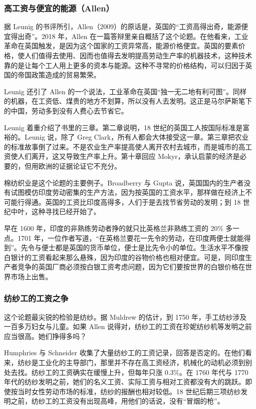 \subsubsection{高工资与便宜的能源（Allen）}
据 Leunig 的书评所引，Allen（2009）的原话是，英国的“工资高得出奇，能源便宜得出奇”\cite{allen2009,leunig2011}。2018 年，Allen 在一篇答辩里亲自概括了这个论题。在他看来，工业革命在英国触发，是因为这个国家的工资异常高，能源价格便宜。英国的要素价格，使人们值得去使用、因而也值得去发明提高劳动生产率的机器技术，这种技术靠的是让每个工人用上更多的资本与能源。这种不寻常的价格结构，可以归因于英国的帝国政策造成的贸易繁荣\cite{allen2018wheels}。

Leunig 还引了 Allen 的一个说法，工业革命在英国“独一无二地有利可图”\cite{leunig2011}。同样的机器，在工资低、煤贵的地方不划算，所以没有人去发明。这正是马尔萨斯笔下的中国，劳动多到没有人费心去节省它。

Leunig 着重介绍了书里的三章。第二章说明，18 世纪的英国工人按国际标准是富裕的。Leunig 说，除了 Greg Clark，所有人都会大体接受这一章。第三章把农业的标准故事倒了过来。不是农业生产率提高使人离开农村去城市，而是城市的高工资使人们离开，这又导致生产率上升\cite{leunig2011}。第十章回应 Mokyr，承认启蒙的经济是必要的，但用欧洲的证据论证它不充分\cite{leunig2011}。

棉纺织业是这个论题的主要例子。Broadberry 与 Gupta 说，英国国内的生产者没有试图模仿印度劳动密集的生产方法，因为按英国的工资水平，那样做在经济上不可能行得通。英国的工资比印度高得多，人们于是去找节省劳动的发明；到 18 世纪中叶，这种寻找已经开始了\cite{bg2005}。

早在 1600 年，印度的非熟练劳动者挣的就只比英格兰非熟练工资的 20\% 多一点。1701 年，一位作者写道，“在英格兰要花一先令的劳动，在印度两便士就能得到”\cite{bg2005}。先令与便士都是英国的货币单位，便士是比先令小的单位。生活水平不像按白银计的工资看起来那么悬殊，因为印度的谷物价格也相对便宜。可是，同印度生产者竞争的英国厂商必须按白银工资考虑问题，因为它们要按世界的白银价格在世界市场上出售\cite{bg2005}。

\subsubsection{纺纱工的工资之争}
这个论题最尖锐的检验是纺纱。据 Muldrew 的估计，到 1750 年，手工纺纱涉及一百多万妇女与儿童\cite{humphries2019spin}。如果 Allen 说得对，纺纱工的工资在珍妮纺纱机等发明之前应当很高。她们挣得多吗？

Humphries 与 Schneider 收集了大量纺纱工的工资记录，回答是否定的。在他们看来，纺纱是工业化的主导部门，那里并不存在高工资经济，机械化的动机必须到别处去找\cite{humphries2019spin}。纺纱工的工资确实在缓慢上升，但每年只涨 0.3\%。在 1760 年代与 1770 年代的纺纱发明之前，她们的名义工资、实际工资与相对工资都没有大的跳跃。即使按当时女性劳动市场的标准，纺纱的报酬也相对较低\cite{humphries2019spin}。18 世纪后期三项纺纱发明之前，纺纱工的工资没有出现高峰，用他们的话说，没有“冒烟的枪”\cite{humphries2019spin}。

